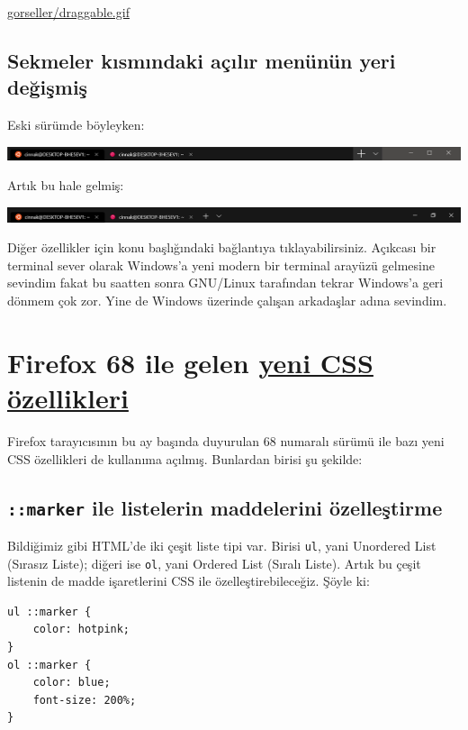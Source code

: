\documentclass[11pt]{article}
\begin{document}
\url{gorseller/draggable.gif}
\subsection{Sekmeler kısmındaki açılır menünün yeri değişmiş}
\label{sec:org3b62f23}
Eski sürümde böyleyken:
\begin{center}
\includegraphics[width=.9\linewidth]{gorseller/title-bar-v02-1.png}
\end{center}

Artık bu hale gelmiş:
\begin{center}
\includegraphics[width=.9\linewidth]{gorseller/title-bar-v03.png}
\end{center}

Diğer özellikler için konu başlığındaki bağlantıya tıklayabilirsiniz. Açıkcası
bir terminal sever olarak Windows'a yeni modern bir terminal arayüzü gelmesine
sevindim fakat bu saatten sonra GNU/Linux tarafından tekrar Windows'a geri
dönmem çok zor. Yine de Windows üzerinde çalışan arkadaşlar adına sevindim.
\section{Firefox 68 ile gelen \href{https://hacks.mozilla.org/2019/07/new-css-features-in-firefox-68/}{yeni CSS özellikleri}}
\label{sec:orgee8e256}
Firefox tarayıcısının bu ay başında duyurulan 68 numaralı sürümü ile bazı yeni
CSS özellikleri de kullanıma açılmış. Bunlardan birisi şu şekilde:

\subsection{\texttt{::marker} ile listelerin maddelerini özelleştirme}
\label{sec:org583a9db}
Bildiğimiz gibi HTML'de iki çeşit liste tipi var. Birisi \texttt{ul}, yani Unordered
List (Sırasız Liste); diğeri ise \texttt{ol}, yani Ordered List (Sıralı Liste).
Artık bu çeşit listenin de madde işaretlerini CSS ile özelleştirebileceğiz.
Şöyle ki:

\begin{verbatim}
ul ::marker {
    color: hotpink;
}
ol ::marker {
    color: blue;
    font-size: 200%;
}
\end{verbatim}
\end{document}
